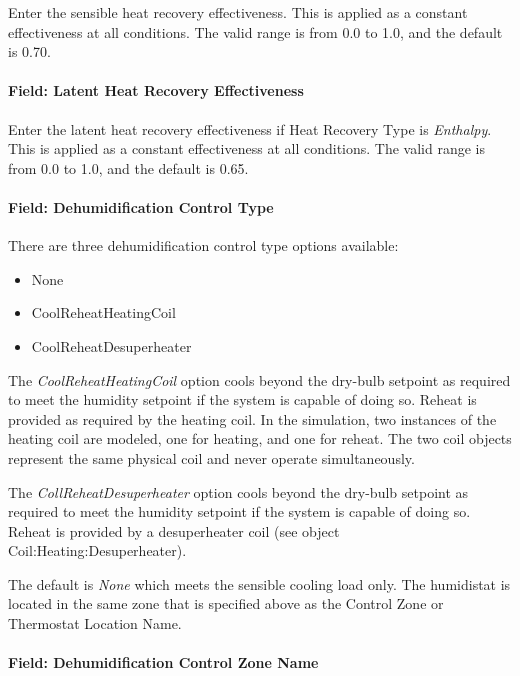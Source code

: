 Enter the sensible heat recovery effectiveness. This is applied as a constant effectiveness at all conditions. The valid range is from 0.0 to 1.0, and the default is 0.70.

\paragraph{Field: Latent Heat Recovery Effectiveness}\label{field-latent-heat-recovery-effectiveness-1}

Enter the latent heat recovery effectiveness if Heat Recovery Type is \emph{Enthalpy}. This is applied as a constant effectiveness at all conditions. The valid range is from 0.0 to 1.0, and the default is 0.65.

\paragraph{Field: Dehumidification Control Type}\label{field-dehumidification-control-type-1}

There are three dehumidification control type options available:

\begin{itemize}
\item
  None
\item
  CoolReheatHeatingCoil
\item
  CoolReheatDesuperheater
\end{itemize}

The \emph{CoolReheatHeatingCoil} option cools beyond the dry-bulb setpoint as required to meet the humidity setpoint if the system is capable of doing so. Reheat is provided as required by the heating coil. In the simulation, two instances of the heating coil are modeled, one for heating, and one for reheat. The two coil objects represent the same physical coil and never operate simultaneously.

The \emph{CollReheatDesuperheater} option cools beyond the dry-bulb setpoint as required to meet the humidity setpoint if the system is capable of doing so. Reheat is provided by a desuperheater coil (see object Coil:Heating:Desuperheater).

The default is \emph{None} which meets the sensible cooling load only. The humidistat is located in the same zone that is specified above as the Control Zone or Thermostat Location Name.

\paragraph{Field: Dehumidification Control Zone Name}\label{field-dehumidification-control-zone-name}

